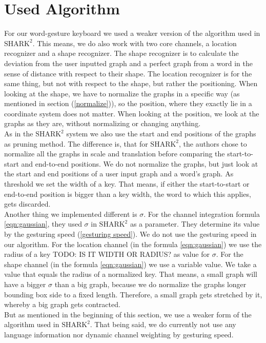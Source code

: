 \section{Used Algorithm}
For our word-gesture keyboard we used a weaker version of the algorithm used in $\text{SHARK}^2$. This means, we do also work with two core channels, a location recognizer and a shape recognizer. The shape recognizer is to calculate the deviation from the user inputted graph and a perfect graph from a word in the sense of distance with respect to their shape. The location recognizer is for the same thing, but not with respect to the shape, but rather the positioning. When looking at the shape, we have to normalize the graphs in a specific way (as mentioned in section (\ref{normalize})), so the position, where they exactly lie in a coordinate system does not matter. When looking at the position, we look at the graphs as they are, without normalizing or changing anything.\\
As in the $\text{SHARK}^2$ system we also use the start and end positions of the graphs as pruning method. The difference is, that for $\text{SHARK}^2$, the authors chose to normalize all the graphs in scale and translation before comparing the start-to-start and end-to-end positions. We do not normalize the graphs, but just look at the start and end positions of a user input graph and a word's graph. As threshold we set the width of a key. That means, if either the start-to-start or end-to-end position is bigger than a key width, the word to which this applies, gets discarded.\\
Another thing we implemented different is $\sigma$. For the channel integration formula \ref{eqn:gaussian}, they used $\sigma$ in $\text{SHARK}^2$ as a parameter. They determine its value by the gesturing speed (\ref{gesturing speed}). We do not use the gesturing speed in our algorithm. For the location channel (in the formula \ref{eqn:gaussian}) we use the radius of a key TODO: IS IT WIDTH OR RADIUS? as value for $\sigma$. For the shape channel (in the formula \ref{eqn:gaussian}) we use a variable value. We take a value that equals the radius of a normalized key. That means, a small graph will have a bigger $\sigma$ than a big graph, because we do normalize the graphs longer bounding box side to a fixed length. Therefore, a small graph gets stretched by it, whereby a big graph gets contracted.\\
But as mentioned in the beginning of this section, we use a weaker form of the algorithm used in $\text{SHARK}^2$. That being said, we do currently not use any language information nor dynamic channel weighting by gesturing speed.

